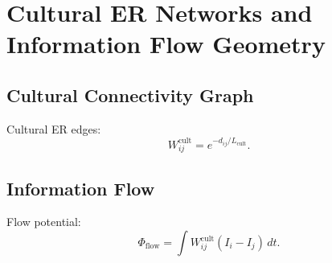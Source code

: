 \chapter{Cultural ER Networks and Information Flow Geometry}

\section{Cultural Connectivity Graph}
Cultural ER edges:
\[
W_{ij}^{\mathrm{cult}} = e^{-d_{ij}/L_{\mathrm{cult}}}.
\]

\section{Information Flow}
Flow potential:
\[
\Phi_{\mathrm{flow}} = \int W^{\mathrm{cult}}_{ij}(I_i - I_j)\,dt.
\]

